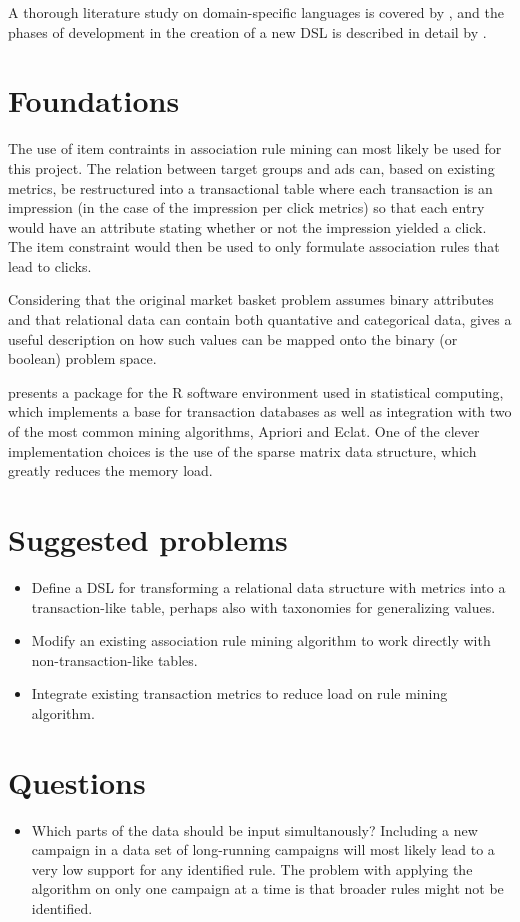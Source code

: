 \documentclass[a4paper]{article}
\begin{document}
A thorough literature study on domain-specific languages is covered by \citet{Deursen2000}, and the phases of development in 
the creation of a new DSL is described in detail by \citet{Mernik2005}.

\section{Foundations}

The use of item contraints in association rule mining \citep{Srikant1997} can most likely be used for this project. The 
relation between target groups and ads can, based on existing metrics, be restructured into a transactional table where each 
transaction is an impression (in the case of the impression per click metrics) so that each entry would have an attribute 
stating whether or not the impression yielded a click. The item constraint would then be used to only formulate association 
rules that lead to clicks.

Considering that the original market basket problem assumes binary attributes and that relational data can contain both
quantative and categorical data, \citep{Srikant1996} gives a useful description on how such values can be mapped onto the
binary (or boolean) problem space.

\citet{Hahsler07} presents a package for the R software environment used in statistical computing, which implements a base
for transaction databases as well as integration with two of the most common mining algorithms, Apriori and Eclat. One of the
clever implementation choices is the use of the sparse matrix data structure, which greatly reduces the memory load.

\section{Suggested problems}
\begin{itemize}
	\item Define a DSL for transforming a relational data structure with metrics into a transaction-like table, 
			perhaps also with taxonomies for generalizing values.
	\item Modify an existing association rule mining algorithm to work directly with non-transaction-like tables.
	\item Integrate existing transaction metrics to reduce load on rule mining algorithm.
\end{itemize}

\section{Questions}
\begin{itemize}
	\item Which parts of the data should be input simultanously? Including a new campaign in a data set of long-running 
		campaigns will most likely lead to a very low support for any identified rule. The problem with applying the algorithm
		on only one campaign at a time is that broader rules might not be identified.
\end{itemize}
\end{document}
